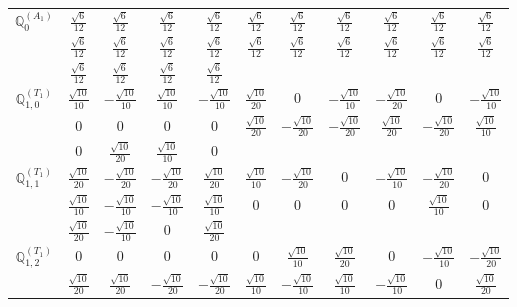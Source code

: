 \documentclass[fleqn,10pt,landscape]{article}
\begin{document}
\begin{itemize}
{\begin{center}
\begin{longtable}{ccccccccccc}
$\mathbb{Q}_{0}^{(A_{1})}$ & $ \frac{\sqrt{6}}{12} $ & $ \frac{\sqrt{6}}{12} $ & $ \frac{\sqrt{6}}{12} $ & $ \frac{\sqrt{6}}{12} $ & $ \frac{\sqrt{6}}{12} $ & $ \frac{\sqrt{6}}{12} $ & $ \frac{\sqrt{6}}{12} $ & $ \frac{\sqrt{6}}{12} $ & $ \frac{\sqrt{6}}{12} $ & $ \frac{\sqrt{6}}{12} $ \\
& $ \frac{\sqrt{6}}{12} $ & $ \frac{\sqrt{6}}{12} $ & $ \frac{\sqrt{6}}{12} $ & $ \frac{\sqrt{6}}{12} $ & $ \frac{\sqrt{6}}{12} $ & $ \frac{\sqrt{6}}{12} $ & $ \frac{\sqrt{6}}{12} $ & $ \frac{\sqrt{6}}{12} $ & $ \frac{\sqrt{6}}{12} $ & $ \frac{\sqrt{6}}{12} $ \\
& $ \frac{\sqrt{6}}{12} $ & $ \frac{\sqrt{6}}{12} $ & $ \frac{\sqrt{6}}{12} $ & $ \frac{\sqrt{6}}{12} $ & $  $ & $  $ & $  $ & $  $ & $  $ & $  $ \\ \hline
$\mathbb{Q}_{1,0}^{(T_{1})}$ & $ \frac{\sqrt{10}}{10} $ & $ - \frac{\sqrt{10}}{10} $ & $ \frac{\sqrt{10}}{10} $ & $ - \frac{\sqrt{10}}{10} $ & $ \frac{\sqrt{10}}{20} $ & $ 0 $ & $ - \frac{\sqrt{10}}{10} $ & $ - \frac{\sqrt{10}}{20} $ & $ 0 $ & $ - \frac{\sqrt{10}}{10} $ \\
& $ 0 $ & $ 0 $ & $ 0 $ & $ 0 $ & $ \frac{\sqrt{10}}{20} $ & $ - \frac{\sqrt{10}}{20} $ & $ - \frac{\sqrt{10}}{20} $ & $ \frac{\sqrt{10}}{20} $ & $ - \frac{\sqrt{10}}{20} $ & $ \frac{\sqrt{10}}{10} $ \\
& $ 0 $ & $ \frac{\sqrt{10}}{20} $ & $ \frac{\sqrt{10}}{10} $ & $ 0 $ & $  $ & $  $ & $  $ & $  $ & $  $ & $  $ \\ \hline
$\mathbb{Q}_{1,1}^{(T_{1})}$ & $ \frac{\sqrt{10}}{20} $ & $ - \frac{\sqrt{10}}{20} $ & $ - \frac{\sqrt{10}}{20} $ & $ \frac{\sqrt{10}}{20} $ & $ \frac{\sqrt{10}}{10} $ & $ - \frac{\sqrt{10}}{20} $ & $ 0 $ & $ - \frac{\sqrt{10}}{10} $ & $ - \frac{\sqrt{10}}{20} $ & $ 0 $ \\
& $ \frac{\sqrt{10}}{10} $ & $ - \frac{\sqrt{10}}{10} $ & $ - \frac{\sqrt{10}}{10} $ & $ \frac{\sqrt{10}}{10} $ & $ 0 $ & $ 0 $ & $ 0 $ & $ 0 $ & $ \frac{\sqrt{10}}{10} $ & $ 0 $ \\
& $ \frac{\sqrt{10}}{20} $ & $ - \frac{\sqrt{10}}{10} $ & $ 0 $ & $ \frac{\sqrt{10}}{20} $ & $  $ & $  $ & $  $ & $  $ & $  $ & $  $ \\ \hline
$\mathbb{Q}_{1,2}^{(T_{1})}$ & $ 0 $ & $ 0 $ & $ 0 $ & $ 0 $ & $ 0 $ & $ \frac{\sqrt{10}}{10} $ & $ \frac{\sqrt{10}}{20} $ & $ 0 $ & $ - \frac{\sqrt{10}}{10} $ & $ - \frac{\sqrt{10}}{20} $ \\
& $ \frac{\sqrt{10}}{20} $ & $ \frac{\sqrt{10}}{20} $ & $ - \frac{\sqrt{10}}{20} $ & $ - \frac{\sqrt{10}}{20} $ & $ \frac{\sqrt{10}}{10} $ & $ - \frac{\sqrt{10}}{10} $ & $ \frac{\sqrt{10}}{10} $ & $ - \frac{\sqrt{10}}{10} $ & $ 0 $ & $ \frac{\sqrt{10}}{20} $ \\

\end{longtable}
\end{center}}
\end{itemize}
\end{document}
